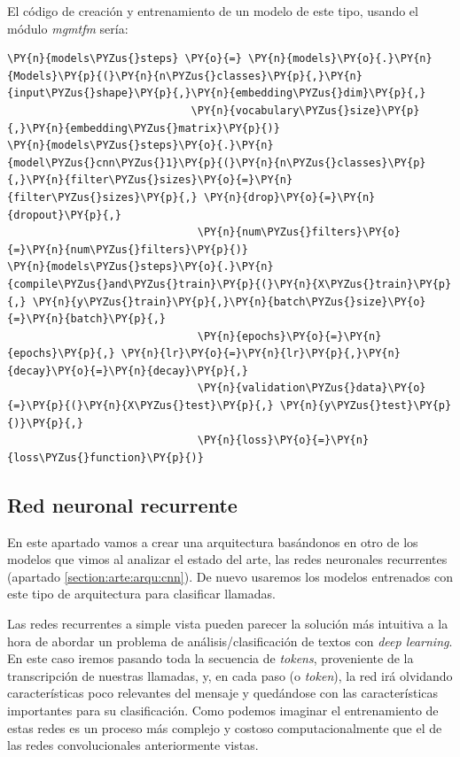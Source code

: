 El código de creación y entrenamiento de un modelo de este tipo, usando el módulo \textit{mgmtfm} sería: 
\vspace{0.5cm}
   
   
    \begin{tcolorbox}[breakable, size=fbox, boxrule=1pt, pad at break*=1mm,colback=cellbackground, colframe=cellborder]
\begin{Verbatim}[commandchars=\\\{\}]
\PY{n}{models\PYZus{}steps} \PY{o}{=} \PY{n}{models}\PY{o}{.}\PY{n}{Models}\PY{p}{(}\PY{n}{n\PYZus{}classes}\PY{p}{,}\PY{n}{input\PYZus{}shape}\PY{p}{,}\PY{n}{embedding\PYZus{}dim}\PY{p}{,}
                             \PY{n}{vocabulary\PYZus{}size}\PY{p}{,}\PY{n}{embedding\PYZus{}matrix}\PY{p}{)}
\PY{n}{models\PYZus{}steps}\PY{o}{.}\PY{n}{model\PYZus{}cnn\PYZus{}1}\PY{p}{(}\PY{n}{n\PYZus{}classes}\PY{p}{,}\PY{n}{filter\PYZus{}sizes}\PY{o}{=}\PY{n}{filter\PYZus{}sizes}\PY{p}{,} \PY{n}{drop}\PY{o}{=}\PY{n}{dropout}\PY{p}{,} 
                              \PY{n}{num\PYZus{}filters}\PY{o}{=}\PY{n}{num\PYZus{}filters}\PY{p}{)}
\PY{n}{models\PYZus{}steps}\PY{o}{.}\PY{n}{compile\PYZus{}and\PYZus{}train}\PY{p}{(}\PY{n}{X\PYZus{}train}\PY{p}{,} \PY{n}{y\PYZus{}train}\PY{p}{,}\PY{n}{batch\PYZus{}size}\PY{o}{=}\PY{n}{batch}\PY{p}{,}
                              \PY{n}{epochs}\PY{o}{=}\PY{n}{epochs}\PY{p}{,} \PY{n}{lr}\PY{o}{=}\PY{n}{lr}\PY{p}{,}\PY{n}{decay}\PY{o}{=}\PY{n}{decay}\PY{p}{,} 
                              \PY{n}{validation\PYZus{}data}\PY{o}{=}\PY{p}{(}\PY{n}{X\PYZus{}test}\PY{p}{,} \PY{n}{y\PYZus{}test}\PY{p}{)}\PY{p}{,}
                              \PY{n}{loss}\PY{o}{=}\PY{n}{loss\PYZus{}function}\PY{p}{)} 
\end{Verbatim}
\end{tcolorbox}
   
   


\subsection{Red neuronal recurrente}
En este apartado vamos a crear una arquitectura basándonos en otro de los modelos que vimos al analizar el estado del arte, las redes neuronales recurrentes (apartado \ref{section:arte:arqu:cnn}). De nuevo usaremos los modelos entrenados con este tipo de arquitectura para clasificar llamadas.

Las redes recurrentes a simple vista pueden parecer la solución más intuitiva a la hora de abordar un problema de análisis/clasificación de textos con \textit{deep learning}. En este caso iremos pasando toda la secuencia de \textit{tokens}, proveniente de la transcripción de nuestras llamadas, y, en cada paso (o \textit{token}), la red irá olvidando características poco relevantes del mensaje y quedándose con las características importantes para su clasificación. Como podemos imaginar el entrenamiento de estas redes es un proceso más complejo y costoso computacionalmente que el de las redes convolucionales anteriormente vistas.





